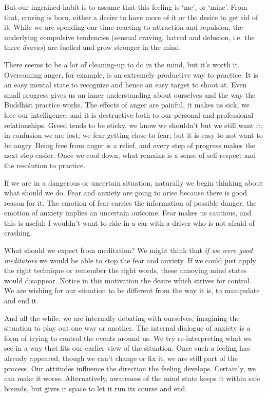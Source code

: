 But our ingrained habit is to assume that this feeling is `me', or
`mine'. From that, craving is born, either a desire to have more of it
or the desire to get rid of it. While we are spending our time reacting
to attraction and repulsion, the underlying compulsive tendencies
(sensual craving, hatred and delusion, i.e. the three \emph{āsavas}) are
fuelled and grow stronger in the mind.

There seems to be a lot of cleaning-up to do in the mind, but it's worth
it. Overcoming anger, for example, is an extremely productive way to
practice. It is an easy mental state to recognize and hence an easy
target to shoot at. Even small progress gives us an inner understanding
about ourselves and the way the Buddhist practice works. The effects of
anger are painful, it makes us sick, we lose our intelligence, and it is
destructive both to our personal and professional relationships. Greed
tends to be sticky, we know we shouldn't but we still want it; in
confusion we are lost; we fear getting close to fear; but it is easy to
not want to be angry. Being free from anger is a relief, and every step
of progress makes the next step easier. Once we cool down, what remains
is a sense of self-respect and the resolution to practice.


If we are in a dangerous or uncertain situation, naturally we begin
thinking about what should we do. Fear and anxiety are going to arise
because there is good reason for it. The emotion of fear carries the
information of possible danger, the emotion of anxiety implies an
uncertain outcome. Fear makes us cautious, and this is useful: I
wouldn't want to ride in a car with a driver who is not afraid of
crashing.

What should we expect from meditation? We might think that \emph{if we
were good meditators} we would be able to stop the fear and anxiety. If
we could just apply the right technique or remember the right words,
these annoying mind states would disappear. Notice in this motivation
the desire which strives for control. We are wishing for our situation
to be different from the way it is, to manipulate and end it.

And all the while, we are internally debating with ourselves, imagining
the situation to play out one way or another. The internal dialogue of
anxiety is a form of trying to control the events around us. We try
re-interpreting what we see in a way that fits our earlier view of the
situation. Once such a feeling has already appeared, though we can't
change or fix it, we are still part of the process. Our attitudes
influence the direction the feeling develops. Certainly, we can make it
worse. Alternatively, awareness of the mind state keeps it within safe
bounds, but gives it space to let it run its course and end.

